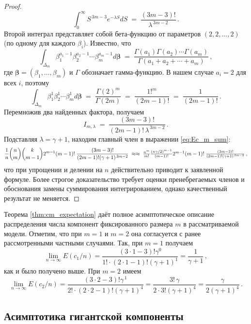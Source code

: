 \begin{proof}
\[
\int_{0}^{\infty} S^{\,3m-3} e^{-\lambda S} dS \;=\; \frac{(3m-3)!}{\lambda^{\,3m-2}}\,.
\] 
Второй интеграл представляет собой бета-функцию от параметров $(2,2,\dots,2)$ (по одному для каждого $\beta_i$). Известно, что 
\[
\int_{\Delta_{m}} \beta_1^{a_1-1}\beta_2^{a_2-1}\cdots\beta_m^{a_m-1} d\boldsymbol{\beta} \;=\; \frac{\Gamma(a_1)\Gamma(a_2)\cdots\Gamma(a_m)}{\Gamma(a_1+a_2+\cdots+a_m)}\,,
\] 
где $\boldsymbol{\beta} = (\beta_1,\dots,\beta_m)$ и $\Gamma$ обозначает гамма-функцию. В нашем случае $a_i = 2$ для всех $i$, поэтому 
\[
\int_{\Delta_{m}} \beta_1^1 \beta_2^1\cdots \beta_m^1 d\boldsymbol{\beta} \;=\; \frac{\Gamma(2)^m}{\Gamma(2m)} \;=\; \frac{1!^m}{(2m-1)!} \;=\; \frac{1}{(2m-1)!}\,. 
\] 
Перемножив два найденных фактора, получаем 
\[
I_{m,\lambda} \;=\; \frac{(3m-3)!}{(2m-1)!\, \lambda^{\,3m-2}}\,.
\] 
Подставляя $\lambda = \gamma+1$, находим главный член в выражении \eqref{eq:Ec_m_sum}:
\[
\frac{1}{n}\binom{n}{m}\binom{k}{m-1} 2^{m-1}(m-1)! \;\frac{(3m-3)!}{(2m-1)!(\gamma+1)^{\,3m-2}} \;\approx $$ $$ \approx \; \frac{n^m}{m!} \frac{(n\gamma/2)^{m-1}}{(m-1)!} 2^{m-1}(m-1)! \;\frac{(3m-3)!}{(2m-1)!(\gamma+1)^{\,3m-2}}\,,
\] 
что при упрощении и делении на $n$ действительно приводит к заявленной формуле. Более строгое доказательство требует оценки пренебрегаемых членов и обоснования замены суммирования интегрированием, однако качественный результат не меняется.
\end{proof}

Теорема \ref{thm:cm_expectation} даёт полное асимптотическое описание распределения числа компонент фиксированного размера $m$ в рассматриваемой модели. Отметим, что при $m=1$ и $m=2$ она согласуется с ранее рассмотренными частными случаями. Так, при $m=1$ получаем 
\[
\lim_{n\to\infty} E(c_1/n) = \frac{(3\cdot 1 - 3)! \gamma^0}{1! \cdot (2\cdot 1 - 1)! (\gamma+1)^{1}} = \frac{1}{\gamma+1}\,,
\] 
как и было получено выше. При $m=2$ имеем 
\[
\lim_{n\to\infty} E(c_2/n) = \frac{(3\cdot 2 - 3)! \gamma^{\,1}}{2! \cdot (2\cdot 2 - 1)! (\gamma+1)^{4}} = \frac{3! \,\gamma}{2 \cdot 3! (\gamma+1)^4} = \frac{\gamma}{2 (\gamma+1)^4}\,.
\] 

\subsection{Асимптотика гигантской компоненты}

